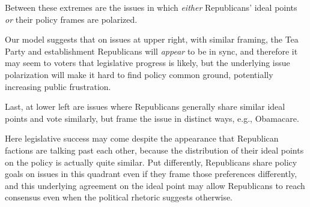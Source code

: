 Between these extremes are the issues in which \emph{either} Republicans' ideal
points \emph{or} their policy frames are polarized. Our model
suggests that on issues at upper right, with similar framing, the Tea Party and
establishment Republicans will \emph{appear} to be in sync, and therefore it may
seem to voters that legislative progress is likely, but the underlying issue
polarization will make it hard to find policy common ground, potentially
increasing public frustration. Last, at lower left are issues where Republicans
generally share similar ideal points and vote similarly, but frame the issue in
distinct ways, e.g., Obamacare. Here legislative success may come despite the appearance
that Republican factions are talking past each other, because the distribution of their ideal points on the policy is actually quite similar. Put differently, Republicans share policy goals on issues in this quadrant even if they frame those preferences differently, and this underlying agreement on the ideal point may allow Republicans to reach consensus even when the political rhetoric suggests otherwise.
